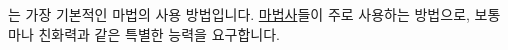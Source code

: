\documentclass{report}
\begin{document}
	는 가장 기본적인 마법의 사용 방법입니다. \hyperlink{class:wizard}{마법사}들이 주로 사용하는 방법으로, 보통 마나 친화력과 같은 특별한 능력을 요구합니다.
\end{document}
